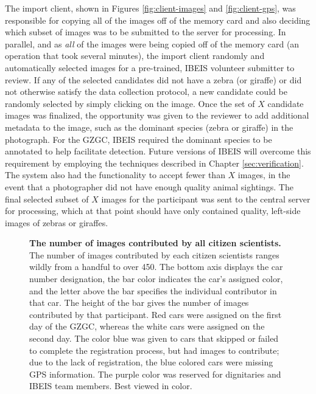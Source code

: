 The import client, shown in Figures \ref{fig:client-images} and \ref{fig:client-gps}, was responsible for copying all of the images off of the memory card and also deciding which subset of images was to be submitted to the server for processing.  In parallel, and as \textit{all} of the images were being copied off of the memory card (an operation that took several minutes), the import client randomly and automatically selected images for a pre-trained, IBEIS volunteer submitter to review.  If any of the selected candidates did not have a zebra (or giraffe) or did not otherwise satisfy the data collection protocol, a new candidate could be randomly selected by simply clicking on the image.  Once the set of $X$ candidate images was finalized, the opportunity was given to the reviewer to add additional metadata to the image, such as the dominant species (zebra or giraffe) in the photograph.  For the GZGC, IBEIS required the dominant species to be annotated to help facilitate detection.  Future versions of IBEIS will overcome this requirement by employing the techniques described in Chapter \ref{sec:verification}.  The system also had the functionality to accept fewer than $X$ images, in the event that a photographer did not have enough quality animal sightings.  The final selected subset of $X$ images for the participant was sent to the central server for processing, which at that point should have only contained quality, left-side images of zebras or giraffes.  %

\begin{figure}[t]%
	\centering
    	\caption[The Number of Images Contributed by All Citizen Scientists]{\textbf{The number of images contributed by all citizen scientists.}  The number of images contributed by each citizen scientists ranges wildly from a handful to over 450.  The bottom axis displays the car number designation, the bar color indicates the car's assigned color, and the letter above the bar specifies the individual contributor in that car.  The height of the bar gives the number of images contributed by that participant.  Red cars were assigned on the first day of the GZGC, whereas the white cars were assigned on the second day.  The color blue was given to cars that skipped or failed to complete the registration process, but had images to contribute; due to the lack of registration, the blue colored cars were missing GPS information.  The purple color was reserved for dignitaries and IBEIS team members.  Best viewed in color.}
    	\label{fig:contributions}
\end{figure}

